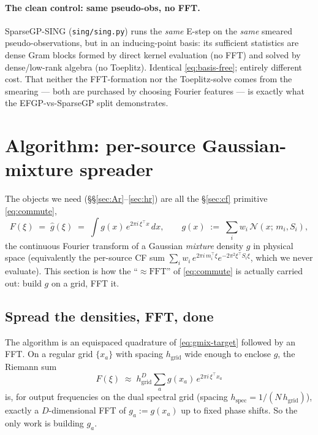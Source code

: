 \documentclass[11pt]{article}
\newcommand{\code}[1]{\texttt{\small #1}}
\begin{document}
\paragraph{The clean control: same pseudo-obs, no FFT.}
SparseGP-SING (\code{sing/sing.py}) runs the \emph{same} E-step on the
\emph{same} smeared pseudo-observations, but in an inducing-point
basis: its sufficient statistics are dense Gram blocks formed by direct
kernel evaluation (no FFT) and solved by dense/low-rank algebra (no
Toeplitz).  Identical \eqref{eq:basis-free}; entirely different cost.
That neither the FFT-formation nor the Toeplitz-solve comes from the
smearing --- both are purchased by choosing Fourier features --- is
exactly what the EFGP-vs-SparseGP split demonstrates.

\section{Algorithm: per-source Gaussian-mixture spreader}
\label{sec:gmix-spreader}

The objects we need (\S\S\ref{sec:Ar}--\ref{sec:hr}) are all the
\S\ref{sec:cf} primitive \eqref{eq:commute},
\begin{equation}
F(\xi)
\;=\;
\widehat g(\xi)
\;=\;
\int g(x)\,e^{2\pi i\,\xi^\top x}\,dx,
\qquad
g(x) \;:=\; \sum_i w_i\,\mathcal{N}(x;\,m_i, S_i),
\label{eq:gmix-target}
\end{equation}
the continuous Fourier transform of a Gaussian \emph{mixture} density
$g$ in physical space (equivalently the per-source CF sum $\sum_i w_i\,
e^{2\pi i\,m_i^\top\xi}e^{-2\pi^2\xi^\top S_i\xi}$, which we never
evaluate).  This section is how the ``$\approx\mathrm{FFT}$'' of
\eqref{eq:commute} is actually carried out: build $g$ on a grid, FFT it.

\subsection{Spread the densities, FFT, done}
\label{sec:plain-story}

The algorithm is an equispaced quadrature of \eqref{eq:gmix-target}
followed by an FFT.  On a regular grid $\{x_a\}$ with spacing
$h_{\text{grid}}$ wide enough to enclose $g$, the Riemann sum
\begin{equation}
F(\xi) \;\approx\;
h_{\text{grid}}^{D}\sum_a g(x_a)\,e^{2\pi i\,\xi^\top x_a}
\label{eq:riemann}
\end{equation}
is, for output frequencies on the dual spectral grid (spacing
$h_{\text{spec}} = 1/(N\,h_{\text{grid}})$), exactly a $D$-dimensional
FFT of $g_a := g(x_a)$ up to fixed phase shifts.  So the only work is
building $g_a$.
\end{document}
